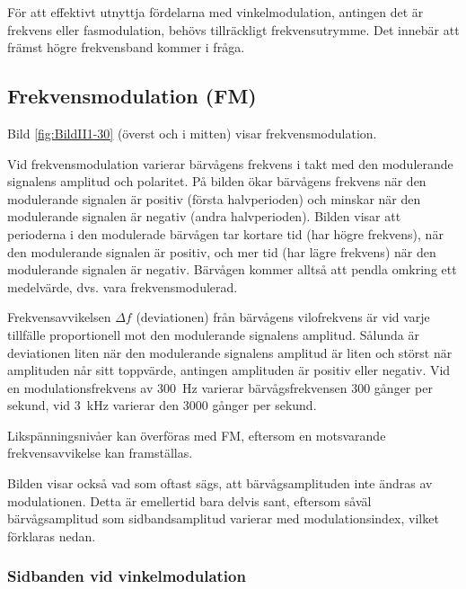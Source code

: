 För att effektivt utnyttja fördelarna med vinkelmodulation, antingen det är
frekvens eller fasmodulation, behövs tillräckligt frekvensutrymme.
Det innebär att främst högre frekvensband kommer i fråga.

\newpage
\subsection{Frekvensmodulation (FM)}
\label{modulation_fm}


Bild \ref{fig:BildII1-30} (överst och i mitten) visar frekvensmodulation.

Vid frekvensmodulation varierar bärvågens frekvens i takt med den modulerande
signalens amplitud och polaritet.
På bilden ökar bärvågens frekvens när den modulerande signalen är positiv
(första halvperioden) och minskar när den modulerande signalen är negativ
(andra halvperioden).
Bilden visar att perioderna i den modulerade bärvågen tar kortare tid (har
högre frekvens), när den modulerande signalen är positiv, och mer tid (har lägre
frekvens) när den modulerande signalen är negativ.
Bärvågen kommer alltså att pendla omkring ett medelvärde, dvs. vara
frekvensmodulerad.

Frekvensavvikelsen \(\Delta f\) (deviationen) från bärvågens vilofrekvens är
vid varje tillfälle proportionell mot den modulerande signalens amplitud.
Sålunda är deviationen liten när den modulerande signalens amplitud är liten
och störst när amplituden når sitt toppvärde, antingen amplituden är positiv
eller negativ.
Vid en modulationsfrekvens av \SI{300}{\hertz} varierar bärvågsfrekvensen 300
gånger per sekund, vid \SI{3}{\kilo\hertz} varierar den 3000 gånger per sekund.

Likspänningsnivåer kan överföras med FM, eftersom en motsvarande
frekvensavvikelse kan framställas.

Bilden visar också vad som oftast sägs, att bärvågsamplituden inte ändras av
modulationen.
Detta är emellertid bara delvis sant, eftersom såväl bärvågsamplitud som
sidbandsamplitud varierar med modulationsindex, vilket förklaras nedan.

\subsubsection{Sidbanden vid vinkelmodulation}


